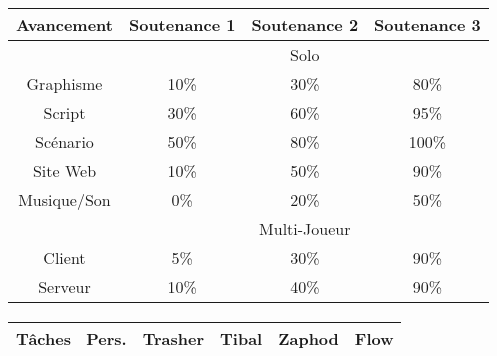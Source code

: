 \documentclass[12pt,a4paper]{article}
\begin{document}
\paragraph{}
\begin{center}
\begin{tabular}{|c|c|c|c|}
\hline 
\rowcolor{cyan} Avancement & Soutenance 1 & Soutenance 2 & Soutenance 3 \\ 
\hline 
\cellcolor{lightgray} &\multicolumn{3}{|c|}{\cellcolor{lightgray} Solo } \\
\hline 
\cellcolor{lightgray}Graphisme & \cellcolor{yellow} 10\% & \cellcolor{yellow} 30\% & \cellcolor{orange} 80\%\\ 
\hline 
\cellcolor{lightgray}Script & \cellcolor{yellow} 30\% &  \cellcolor{orange} 60\% & \cellcolor{red} 95\% \\ 
\hline 
\cellcolor{lightgray}Scénario & \cellcolor{orange} 50\%&  \cellcolor{orange}80\% &  \cellcolor{red}100\% \\ 
\hline 
\cellcolor{lightgray}Site Web & \cellcolor{yellow} 10\% &  \cellcolor{orange}50\% & \cellcolor{red} 90\% \\ 
\hline
\cellcolor{lightgray}Musique/Son & 0\% & \cellcolor{yellow} 20\% &  \cellcolor{orange} 50\% \\ 
\hline 
\cellcolor{lightgray} &\multicolumn{3}{|c|}{\cellcolor{lightgray} Multi-Joueur } \\
\hline 
\cellcolor{lightgray} Client & \cellcolor{yellow} 5\% & \cellcolor{orange} 30\% & \cellcolor{red} 90\% \\ 
\hline 
\cellcolor{lightgray} Serveur & \cellcolor{yellow} 10\% & \cellcolor{orange} 40\% & \cellcolor{red} 90\% \\ 
\hline 

\end{tabular}
\paragraph{}
\begin{tabular}{|c|c|c|c|c|}
 \hline 
 \rowcolor{cyan}Tâches \ Pers. & Trasher & Tibal & Zaphod & Flow \\ 
 \hline 
 

\end{tabular}
\end{center}
\end{document}
